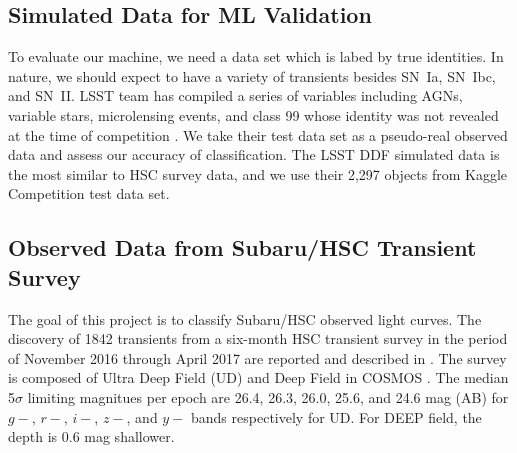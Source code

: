 \documentclass[useamsfonts]{pasj01}
\begin{document}
\subsection{Simulated Data for ML Validation}
\label{sec:validation}
To evaluate our machine, we need a data set which is labed by true identities.   In nature, we should 
expect to have a variety of transients besides SN~Ia, SN~Ibc, and SN~II.
LSST team has compiled a series of variables including AGNs, variable stars, microlensing events,
and class 99 whose identity was not revealed at the time of competition \citep{malz19a,kessler19a}.   
We take their test data set as a pseudo-real observed data and assess our accuracy of classification.
The LSST DDF simulated data is the most similar to HSC survey data, and we use their 2,297 objects 
from Kaggle Competition \citep{malz19a} test data set.

\subsection{Observed Data from Subaru/HSC Transient Survey}
\label{sec:hscdata}
The goal of this project is to classify Subaru/HSC observed light curves. 
The discovery of 1842 transients from a six-month HSC transient survey in the period of
November 2016 through April 2017 are reported and described in \citet{yasuda19a}.
The survey is composed of Ultra Deep Field (UD) and Deep Field in COSMOS \citep{scoville07a}.
The median 5$\sigma$ limiting magnitues per epoch are 26.4, 26.3, 26.0, 25.6, and 24.6 mag (AB)
for $g-$, $r-$, $i-$, $z-$, and $y-$ bands respectively for UD. 
For DEEP field, the depth is 0.6 mag shallower.

%
%
%
\end{document}
